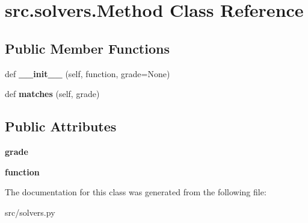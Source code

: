\hypertarget{classsrc_1_1solvers_1_1Method}{}\section{src.\+solvers.\+Method Class Reference}
\label{classsrc_1_1solvers_1_1Method}
\subsection*{Public Member Functions}
\begin{DoxyCompactItemize}
\item 
\mbox{\label{classsrc_1_1solvers_1_1Method_a6c478eb58abd4ef7915f98ea0a127300}} 
def {\bfseries \+\_\+\+\_\+init\+\_\+\+\_\+} (self, function, grade=None)
\item 
\mbox{\label{classsrc_1_1solvers_1_1Method_a945b4fda3e0e9376f49c90bdd7e2cc93}} 
def {\bfseries matches} (self, grade)
\end{DoxyCompactItemize}
\subsection*{Public Attributes}
\begin{DoxyCompactItemize}
\item 
\mbox{\label{classsrc_1_1solvers_1_1Method_a341727ead36b9976f302c5a598398d95}} 
{\bfseries grade}
\item 
\mbox{\label{classsrc_1_1solvers_1_1Method_a786f42fa2ac57ac0c1a99b173ffd1a84}} 
{\bfseries function}
\end{DoxyCompactItemize}


The documentation for this class was generated from the following file\+:\begin{DoxyCompactItemize}
\item 
src/solvers.\+py\end{DoxyCompactItemize}
